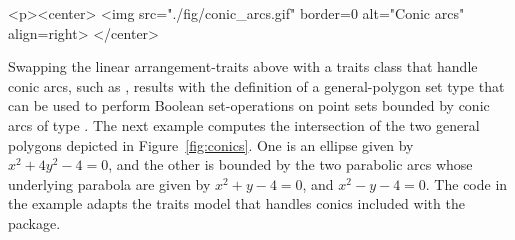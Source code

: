 \lcTex{%
  \setlength{\widthRight}{4.4cm}
  \setlength{\widthLeft}{\widthLineReal}
  \addtolength{\widthLeft}{-\widthRight}
  \begin{minipage}{\widthLeft}
}
\label{fig:conics}
\begin{ccHtmlOnly}
  <p><center>
    <img src="./fig/conic_arcs.gif" border=0 alt="Conic arcs" align=right>
  </center>
\end{ccHtmlOnly}
Swapping the linear arrangement-traits 
above with a traits class that handle conic arcs, such as
, results with the definition of a
general-polygon set type that can be used to perform Boolean 
set-operations on point sets bounded by conic arcs of type
. The next example computes the intersection of the
two general polygons depicted in Figure~\ref{fig:conics}. One is an ellipse
given by $x^2 + 4y^2 - 4 = 0$, and the other is bounded by the two
parabolic arcs whose underlying parabola are given by 
$x^2 + y - 4 = 0$, and $x^2 - y - 4 = 0$. The code in the example adapts
the traits model that handles conics included with the 
package.


